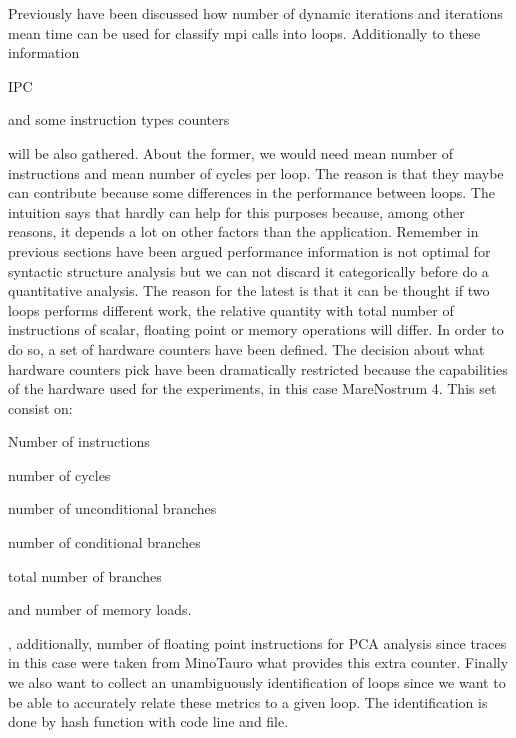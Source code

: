 Previously have been discussed how number of dynamic iterations and iterations 
mean time can be used for classify mpi calls into loops. Additionally to these information
\begin{enumerate*}[label=\roman*)]
    \item IPC 
    \item and some instruction types counters 
\end{enumerate*}
will be also gathered.
About the former, we would need mean number of instructions and mean number of 
cycles per loop. The reason is that they maybe can contribute because some 
differences in the performance between loops. The intuition says that
hardly can help for this purposes because, among other reasons, it depends a lot
on other factors than the application. Remember in previous sections have been argued
performance information is not optimal for syntactic structure analysis but we can not
discard it categorically before do a quantitative analysis. The reason for the
latest is that it can be thought if two loops performs different work, the
relative quantity with total number of instructions of scalar, floating point 
or memory operations will differ. In order to do so, a set of hardware
counters have been defined. The decision about what hardware counters
pick have been dramatically restricted because the capabilities of the
hardware used for the experiments, in this case MareNostrum 4. 
This set consist on:
\begin{enumerate*}[label=\roman*)]
  \item Number of instructions
  \item number of cycles 
  \item number of unconditional branches
  \item number of conditional branches 
  \item total number of branches
  \item and number of memory loads.
\end{enumerate*},
additionally, number of floating point instructions for PCA analysis since
traces in this case were taken from MinoTauro what provides this extra counter. 
Finally we also want to collect an unambiguously identification of loops
since we want to be able to accurately relate these metrics to a given loop.
The identification is done by hash function with code line and file.

